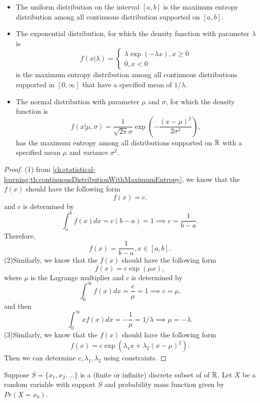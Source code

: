 \begin{refsection}
\begin{corollary}\hfill
	\begin{itemize}
		\item The uniform distribution on the interval $[a,b]$ is the maximum entropy distribution among all continuous distribution supported on $[a,b]$.
		\item The exponential distribution, for which the density function with parameter $\lambda$ is
		$$f(x|\lambda) = \begin{cases*}
		\lambda \exp(-\lambda x), x\geq 0\\
		0, x < 0
		\end{cases*}$$
		is the maximum entropy distribution among all continuous distributions supported in $[0,\infty]$ that have a specified mean of $1/\lambda$.
		\item The normal distribution with parameter $\mu$ and $\sigma$, for which the density function is
		$$f(x|\mu, \sigma) = \frac{1}{\sqrt{2\pi}\sigma} \exp(-\frac{(x-\mu)^2}{2\sigma^2}),$$
		has the maximum entropy among all distributions supported on $\mathbb{R}$ with a specified mean $\mu$ and variance $\sigma^2$.
	\end{itemize}	
\end{corollary}
\begin{proof}
	(1) from \autoref{ch:statistical-learning:th:continuousDistributionWithMaximumEntropy}, we know that the $f(x)$ should have the following form
	$$f(x) = c.$$
	and $c$ is determined by
	$$\int_{a}^b f(x)dx = c(b-a) = 1 \implies c = \frac{1}{b-a}.$$
	Therefore, 
	$$f(x) = \frac{1}{b-a},x\in [a,b].$$
	(2)Similarly,
	we know that the $f(x)$ should have the following form
	$$f(x) = c\exp(\mu x),$$
	where $\mu$ is the Lagrange multiplier
	and $c$ is determined by
	$$\int_{0}^\infty f(x)dx = \frac{c}{\mu} = 1 \implies c = \mu.$$
	and then
	$$\int_{0}^\infty xf(x)dx = -\frac{1}{\mu} = 1/\lambda \implies \mu = -\lambda.$$
	(3)Similarly,
	we know that the $f(x)$ should have the following form
	$$f(x) = c\exp(\lambda_1 x + \lambda_2(x-\mu)^2).$$
	Then we can determine $c,\lambda_1,\lambda_2$ using constraints.
\end{proof}


\begin{theorem}\label{ch:statistical-learning:th:discreteDistributionWithMaximumEntropy}
	Suppose $S = \{x_1,x_2,...\}$ is a (finite or infinite) discrete subset of  of $\mathbb{R}$. Let $X$ be a random variable with support $S$ and probability mass function given by
	$Pr(X = x_k)$.
	

\end{theorem}
\end{refsection}
